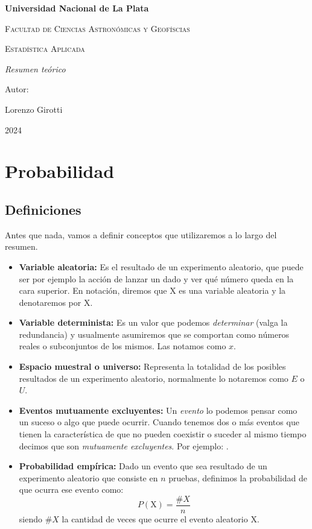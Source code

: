 \documentclass[openany]{book}
\begin{document}
\begin{titlepage}
	\centering
	{\bfseries\LARGE Universidad Nacional de La Plata \par}
	\vspace{1cm}
	{\scshape\Large Facultad de Ciencias Astronómicas y Geofíscias \par}
	\vspace{3cm}
	{\scshape\Huge Estadística Aplicada \par}
	\vspace{3cm}
	{\itshape\Large Resumen teórico \par}
	\vfill
	{\Large Autor: \par}
	{\Large Lorenzo Girotti \par}
	\vfill
	{\Large 2024 \par}
\end{titlepage}

\chapter{Probabilidad}
\section{Definiciones}
Antes que nada, vamos a definir conceptos que utilizaremos a lo largo del resumen.
\begin{itemize}
  \item \textbf{Variable aleatoria:} Es el resultado de un experimento aleatorio, que puede ser por ejemplo la acción de lanzar un dado y ver qué número queda en la cara superior. En notación, diremos que X es una variable aleatoria y la denotaremos por $\mathrm{X}$.
  \item \textbf{Variable determinista:} Es un valor que podemos \emph{determinar} (valga la redundancia) y usualmente asumiremos que se comportan como números reales o subconjuntos de los mismos. Las notamos como $x$.
  \item \textbf{Espacio muestral o universo:} Representa la totalidad de los posibles resultados de un experimento aleatorio, normalmente lo notaremos como $E$ o $U$.
  \item \textbf{Eventos mutuamente excluyentes:} Un \emph{evento} lo podemos pensar como un suceso o algo que puede ocurrir. Cuando tenemos dos o más eventos que tienen la característica de que no pueden coexistir o suceder al mismo tiempo decimos que son \emph{mutuamente excluyentes}. Por ejemplo: .
  \item \rm{\textbf{Probabilidad empírica:} Dado un evento que sea resultado de un experimento aleatorio que consiste en $n$ pruebas, definimos la probabilidad de que ocurra ese evento como:
  \begin{equation}
    \label{eq:prob-emp}
    P(\mathrm{X})=\frac{\#X}{n}
  \end{equation}
		siendo $\#X$ la cantidad de veces que ocurre el evento aleatorio $\mathrm{X}$.} 
\end{itemize}
\end{document}
